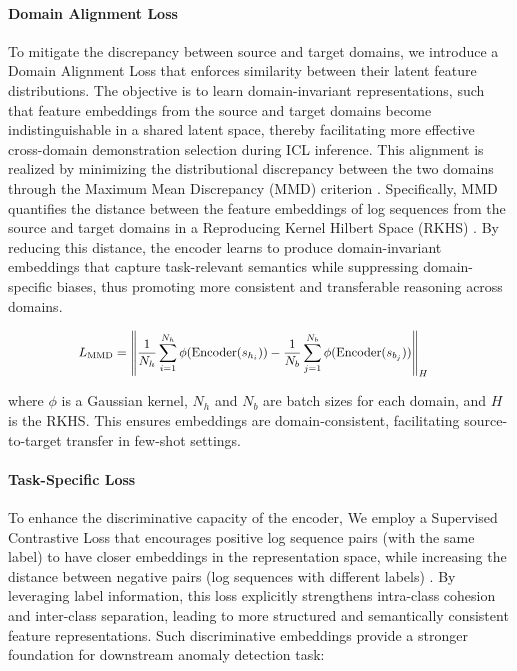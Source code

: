 \documentclass[lettersize,journal]{IEEEtran}
\begin{document}
\paragraph{Domain Alignment Loss} To mitigate the discrepancy between source and target domains, we introduce a Domain Alignment Loss that enforces similarity between their latent feature distributions. The objective is to learn domain-invariant representations, such that feature embeddings from the source and target domains become indistinguishable in a shared latent space, thereby facilitating more effective cross-domain demonstration selection during ICL inference. This alignment is realized by minimizing the distributional discrepancy between the two domains through the Maximum Mean Discrepancy (MMD) criterion \cite{gretton2012kernel}. Specifically, MMD quantifies the distance between the feature embeddings of log sequences from the source and target domains in a Reproducing Kernel Hilbert Space (RKHS) \cite{sriperumbudur2010hilbert}. By reducing this distance, the encoder learns to produce domain-invariant embeddings that capture task-relevant semantics while suppressing domain-specific biases, thus promoting more consistent and transferable reasoning across domains.

\begin{equation}
\scalebox{0.9}{$
\begin{aligned}
L_{\text{MMD}} &= 
\left\| 
\frac{1}{N_h} \sum_{i=1}^{N_h} \phi(\text{Encoder}(s_{h_i})) 
- \frac{1}{N_b} \sum_{j=1}^{N_b} \phi(\text{Encoder}(s_{b_j})) 
\right\|_H
\end{aligned}
$}
\end{equation}

  where $\phi$ is a Gaussian kernel, $N_h$ and $N_b$ are batch sizes for each domain, and $H$ is the RKHS. This ensures embeddings are domain-consistent, facilitating source-to-target transfer in few-shot settings.

\paragraph{Task-Specific Loss} To enhance the discriminative capacity of the encoder, We employ a Supervised Contrastive Loss that encourages positive log sequence pairs (with the same label) to have closer embeddings in the representation space, while increasing the distance between negative pairs (log sequences with different labels) \cite{khosla2020supervised}. By leveraging label information, this loss explicitly strengthens intra-class cohesion and inter-class separation, leading to more structured and semantically consistent feature representations. Such discriminative embeddings provide a stronger foundation for downstream anomaly detection task:
\end{document}
